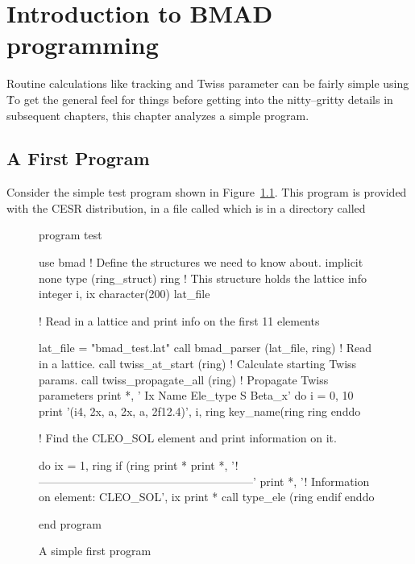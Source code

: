 \chapter{Introduction to BMAD programming}
\label{c:program_info}

Routine calculations like tracking and Twiss parameter can be fairly
simple using \bmad\. To get the general feel for things before
getting into the nitty--gritty details in subsequent chapters, this
chapter analyzes a simple program.

\section{A First Program}

Consider the simple test program shown in Figure~\ref{f:program}.
This program is provided with the CESR distribution, in a file called
 which is in a directory called 

\begin{figure}
\begin{listing}{1}
program test

  use bmad                 ! Define the structures we need to know about.
  implicit none
  type (ring_struct) ring  ! This structure holds the lattice info
  integer i, ix
  character(200) lat_file

! Read in a lattice and print info on the first 11 elements

  lat_file = "bmad_test.lat"
  call bmad_parser (lat_file, ring)    ! Read in a lattice.
  call twiss_at_start (ring)           ! Calculate starting Twiss params.
  call twiss_propagate_all (ring)      ! Propagate Twiss parameters
  print *, ' Ix  Name              Ele_type                   S      Beta_x'
  do i = 0, 10
    print '(i4, 2x, a, 2x, a, 2f12.4)', i, ring%
                    key_name(ring%
                    ring%
  enddo

! Find the CLEO_SOL element and print information on it.

  do ix = 1, ring%
    if (ring%
      print *
      print *, '!---------------------------------------------------------'
      print *, '! Information on element: CLEO_SOL', ix
      print *
      call type_ele (ring%
    endif
  enddo

end program
\end{listing}
\caption{A simple first program}
\label{f:program}
\end{figure}

